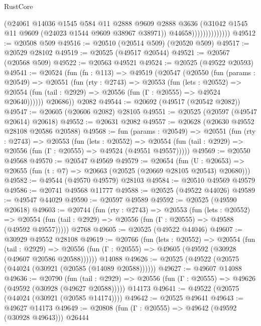 \begin{lexlean}{RustCore}
\begin{coremodule}
                              (@24061
                                @14036
                                @1545
                                @584
                                @11
                                @2888
                                @9609
                                @2888
                                @3636
                                (@31042 @1545 @11 @9609 (@24023 @1544 @9609 @38967 @38971))
                                @44658))))))))))))))
@49512 := @20508 @509
@49516 := @20510 (@20514 @509) (@20520 @509)
@49517 := @20529 @28102
@49519 := @20525 (@49517 @20544)
@49521 := @20567 (@20568 @509)
@49522 := @20563 @49521
@49524 := @20525 (@49522 @20593)
@49541 := @20524
    (fun (fn : @113) =>
    @49519
      (@20547
        (@20550
          (fun (params : @20549) =>
          @20551
            (fun (rty : @2743) =>
            @20553
              (fun (lets : @20552) =>
              @20554 (fun (tail : @2929) => @20556 (fun (Γ : @20555) => @49524 @20640))))))
        @20686))
    @2082
@49544 := @20692 (@49517 (@20542 @2082))
@49547 := @20605 (@20606 @2082) @28105
@49551 := @20525 (@20597 (@49547 @20614) @20618)
@49552 := @20631 @2082
@49557 := @20628 (@20630 @49552 @28108 @20586 @20588)
@49568 := fun (params : @20549) =>
  @20551
    (fun (rty : @2743) =>
    @20553
      (fun (lets : @20552) =>
      @20554 (fun (tail : @2929) => @20556 (fun (Γ : @20555) => @49524 (@49551 @49557)))))
@49569 := @20550 @49568
@49570 := @20547 @49569
@49579 := @20654
    (fun (U : @20653) => @20655 (fun (t : @7) => @20663 (@20525 (@20669 @28105 @20543) @20680)))
@49582 := @49544 (@49570 @49579) @28103
@49584 := @20510 @49569 @49579
@49586 := @20741 @49568 @11777
@49588 := @20525 (@49522 @44026)
@49589 := @49547 @44029
@49590 := @20597 @49589
@49592 := @20525 (@49590 @20618)
@49603 := @20744
    (fun (rty : @2743) =>
    @20553
      (fun (lets : @20552) =>
      @20554 (fun (tail : @2929) => @20556 (fun (Γ : @20555) => @49588 (@49592 @49557)))))
    @2768
@49605 := @20525 (@49522 @44046)
@49607 := @30929 @49552 @28108
@49619 := @20766
    (fun (lets : @20552) =>
    @20554
      (fun (tail : @2929) =>
      @20556 (fun (Γ : @20555) => @49605 (@49592 (@30928 (@49607 @20586 @20588))))))
    @14088
@49626 := @20525 (@49522 (@20575 (@44024 (@30921 (@20585 (@14089 @20588))))))
@49627 := @49607 @14088
@49636 := @20790
    (fun (tail : @2929) => @20556 (fun (Γ : @20555) => @49626 (@49592 (@30928 (@49627 @20588)))))
    @14173
@49641 := @49522 (@20575 (@44024 (@30921 (@20585 @14174))))
@49642 := @20525 @49641
@49643 := @49627 @14173
@49649 := @20808 (fun (Γ : @20555) => @49642 (@49592 (@30928 @49643))) @26444

\end{coremodule}
\end{lexlean}
